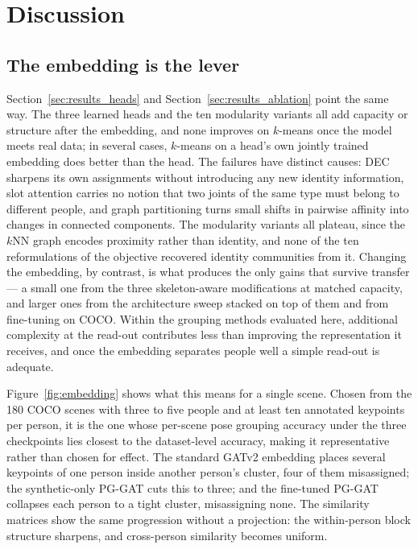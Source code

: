 \section{Discussion}
\label{sec:discussion}

\subsection{The embedding is the lever}
\label{sec:disc_embedding}

Section~\ref{sec:results_heads} and Section~\ref{sec:results_ablation} point the same way.
The three learned heads and the ten modularity variants all add capacity or structure after the embedding,
and none improves on $k$-means once the model meets real data; in several cases, $k$-means on a head's own jointly
trained embedding does better than the head.
The failures have distinct causes: DEC sharpens its own assignments without introducing any new identity
information, slot attention carries no notion that two joints of the same type must belong to different people,
and graph partitioning turns small shifts in pairwise affinity into changes in connected components.
The modularity variants all plateau, since the $k$NN graph encodes proximity rather than identity,
and none of the ten reformulations of the objective recovered identity communities from it.
Changing the embedding, by contrast, is what produces the only gains that survive transfer --- a small one from the
three skeleton-aware modifications at matched capacity, and larger ones from the architecture sweep stacked on top
of them and from fine-tuning on COCO.
Within the grouping methods evaluated here, additional complexity at the read-out contributes less than improving the
representation it receives, and once the embedding separates people well a simple read-out is adequate.

Figure~\ref{fig:embedding} shows what this means for a single scene.
Chosen from the 180 COCO scenes with three to five people and at least ten annotated keypoints per person,
it is the one whose per-scene pose grouping accuracy under the three checkpoints lies closest to the dataset-level
accuracy, making it representative rather than chosen for effect.
The standard GATv2 embedding places several keypoints of one person inside another person's cluster, four of them
misassigned; the synthetic-only PG-GAT cuts this to three; and the fine-tuned PG-GAT collapses each person to a tight
cluster, misassigning none.
The similarity matrices show the same progression without a projection: the within-person block structure sharpens,
and cross-person similarity becomes uniform.

